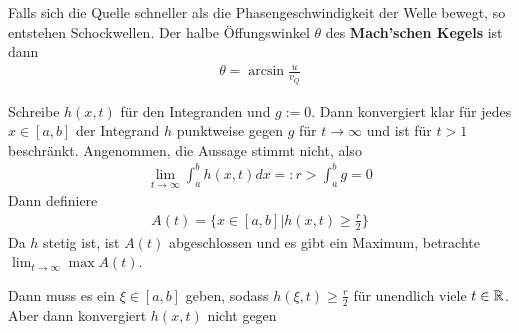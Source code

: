Falls sich die Quelle schneller als die Phasengeschwindigkeit der Welle bewegt, so entstehen Schockwellen. Der halbe Öffungswinkel $\theta$ des \textbf{Mach'schen Kegels} ist dann
\begin{align*}
    \theta = \arcsin \frac{u}{v_Q}
\end{align*}










Schreibe $h(x,t)$ für den Integranden und $g := 0$. Dann konvergiert klar für jedes $x \in [a,b]$ der Integrand $h$ punktweise gegen $g$ für $t \to \infty$ und ist für $t > 1$ beschränkt. 
Angenommen, die Aussage stimmt nicht, also
\begin{align*}
    \lim_{t \to \infty} \int_{a}^{b} h(x,t) dx =: r > \int_{a}^{b} g = 0
\end{align*}
Dann definiere
\begin{align*}
    A(t) = \{x \in [a,b] \big\vert h(x,t) \geq \frac{r}{2}\}
\end{align*}
Da $h$ stetig ist, ist $A(t)$ abgeschlossen und es gibt ein Maximum, betrachte $\lim_{t \to \infty} \max A(t)$.

Dann muss es ein $\xi  \in [a,b]$ geben, sodass $h(\xi,t) \geq \frac{r}{2}$ für unendlich viele $t \in \mathbb{R}$. Aber dann konvergiert $h(x,t)$ nicht gegen
\newpage 
\newpage

